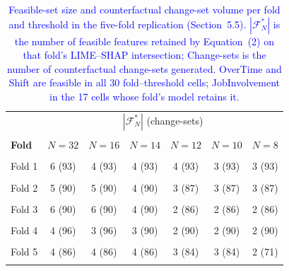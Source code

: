 \documentclass[a4paper,fleqn]{cas-sc}
\begin{document}
\begin{table}[pos=h]
\footnotesize
    \centering
    \caption{\textcolor{blue}{Feasible-set size and counterfactual change-set volume per fold and threshold in the five-fold replication (Section~5.5). $|\mathcal{F}^*_N|$ is the number of feasible features retained by Equation~(2) on that fold's LIME--SHAP intersection; Change-sets is the number of counterfactual change-sets generated. OverTime and Shift are feasible in all 30 fold--threshold cells; JobInvolvement in the 17 cells whose fold's model retains it.}}
    \label{tab:all_folds_feasible}
    \begin{tabular}{@{}lcccccc@{}}
        \toprule
         & \multicolumn{6}{c}{$|\mathcal{F}^*_N|$ (change-sets)} \\\\
        \textbf{Fold} & $N=32$ & $N=16$ & $N=14$ & $N=12$ & $N=10$ & $N=8$ \\\\
        \midrule
        Fold 1 & 6 (93) & 4 (93) & 4 (93) & 4 (93) & 3 (93) & 3 (93) \\\\
        Fold 2 & 5 (90) & 5 (90) & 4 (90) & 3 (87) & 3 (87) & 3 (87) \\\\
        Fold 3 & 6 (90) & 6 (90) & 4 (90) & 2 (86) & 2 (86) & 2 (86) \\\\
        Fold 4 & 4 (96) & 3 (96) & 3 (90) & 2 (90) & 2 (90) & 2 (90) \\\\
        Fold 5 & 4 (86) & 4 (86) & 4 (86) & 3 (84) & 3 (84) & 2 (71) \\\\
        \bottomrule
    \end{tabular}
\end{table}
\end{document}
